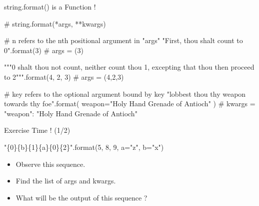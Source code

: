 \documentclass[serif, aspectratio=169]{beamer}
\begin{document}
\begin{frame}[fragile]{string.format() is a Function !}
    \begin{pythoncode}
    # string.format(*args, **kwargs)

    # {n} refers to the nth positional argument in "args"
    "First, thou shalt count to {0}".format(3) # args = (3)

    """{0} shalt thou not count, neither count thou {1},
    excepting that thou then proceed to {2}""".format(4, 2, 3) 
    # args = (4,2,3)

    # {key} refers to the optional argument bound by key
    "lobbest thou thy {weapon} towards thy foe".format(
    weapon="Holy Hand Grenade of Antioch"
    ) 
    # kwargs = {"weapon": "Holy Hand Grenade of Antioch"}
    \end{pythoncode}
\end{frame}

\begin{exoframe}{Exercise Time ! (1/2)}
    \begin{center}
        \Large
        "\{0\}\{b\}\{1\}\{a\}\{0\}\{2\}".format(5, 8, 9, a="z", b="x")
    \end{center}
    \begin{block}{}
        \begin{itemize} \color{white}
            \item[1.] Observe this sequence.
            \item[2.] Find the list of args and kwargs.
            \item[3.] What will be the output of this sequence ?   
        \end{itemize}
    \end{block}
\end{exoframe}
\end{document}
